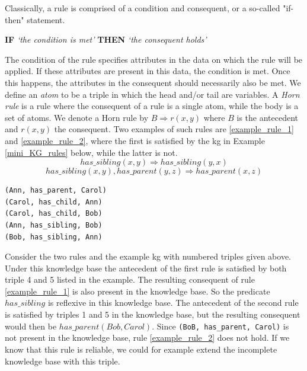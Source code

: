 Classically, a rule is comprised of a condition and consequent, or a so-called "if-then" statement. \begin{center} \textbf{IF} \textit{`the condition is met'} \textbf{THEN} \textit{`the consequent holds'} \end{center}
The condition of the rule specifies attributes in the data on which the rule will be applied. If these attributes are present in this data, the condition is met. Once this happens, the attributes in the consequent should necessarily also be met. We define an \textit{atom} to be a triple in which the head and/or tail are variables. A \textit{Horn rule} is a rule where the consequent of a rule is a single atom, while the body is a set of atoms. We denote a Horn rule by $B \Rightarrow r(x, y)$ where $B$ is the antecedent and $r(x, y)$ the consequent. Two examples of such rules are \ref{example_rule_1} and \ref{example_rule_2}, where the first is satisfied by the \gls{kg} in Example \ref{mini_KG_rules} below, while the latter is not.
\begin{equation}
has\_sibling(x, y) \Rightarrow has\_sibling(y,x)
\label{example_rule_1}
\end{equation}
\begin{equation}
    has\_sibling(x, y), has\_parent(y,z) \Rightarrow has\_parent(x,z)
    \label{example_rule_2}
\end{equation}


\begin{example}[A simple KG.]
\begin{lstlisting}[]
(Ann, has_parent, Carol)
(Carol, has_child, Ann)
(Carol, has_child, Bob)
(Ann, has_sibling, Bob)
(Bob, has_sibling, Ann)
\end{lstlisting}
\label{mini_KG_rules}
\end{example}


Consider the two rules and the example \gls{kg} with numbered triples given above. Under this knowledge base the antecedent of the first rule is satisfied by both triple 4 and 5 listed in the example. The resulting consequent of rule \ref{example_rule_1} is also present in the knowledge base. So the predicate $has\_sibling$ is reflexive in this knowledge base. The antecedent of the second rule is satisfied by triples 1 and 5 in the knowledge base, but the resulting consequent would then be $has\_parent(Bob, Carol)$. Since \texttt{(BoB, has\_parent, Carol)} is not present in the knowledge base, rule \ref{example_rule_2} does not hold. If we know that this rule is reliable, we could for example extend the incomplete knowledge base with this triple.

